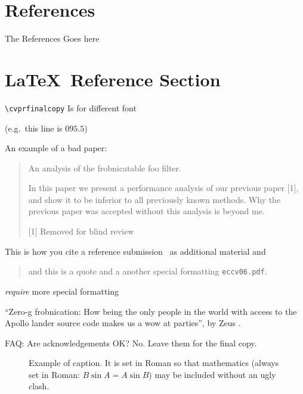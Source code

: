 \documentclass[10pt,twocolumn,letterpaper]{article}
\begin{document}
\section{References}
The References Goes here









\section{\LaTeX\ Reference Section}
\verb'\cvprfinalcopy' Is for different font

(e.g.\ this line is $095.5$)

An example of a bad paper:
\begin{quote}
\begin{center}
    An analysis of the frobnicatable foo filter.
\end{center}

   In this paper we present a performance analysis of our
   previous paper [1], and show it to be inferior to all
   previously known methods.  Why the previous paper was
   accepted without this analysis is beyond me.

   [1] Removed for blind review
\end{quote}

This is how you cite a reference submission~\cite{Authors06} as additional material and

\begin{quote}
and this is a quote and a another special formatting {\tt eccv06.pdf}.
\end{quote}

{\em require} more special formatting

``Zero-g frobnication: How being the only people in the world with access to
the Apollo lander source code makes us a wow at parties'', by Zeus \etal.

FAQ: Are acknowledgements OK?  No.  Leave them for the final copy.


\begin{figure}[t]
  \begin{center}
    \fbox{\rule{0pt}{2in} \rule{0.9\linewidth}{0pt}}
  \end{center}
    \caption{Example of caption.  It is set in Roman so that mathematics
    (always set in Roman: $B \sin A = A \sin B$) may be included without an
    ugly clash.}
  \label{fig:long}
  \label{fig:onecol}
\end{figure}
\end{document}
